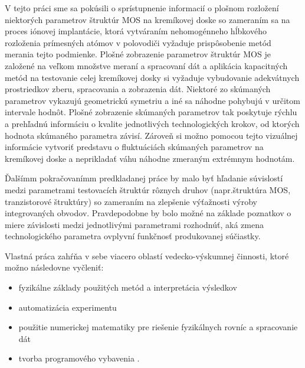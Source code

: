 
\par V tejto práci sme sa pokúsili o sprístupnenie informacií o
plošnom rozložení niektorých parametrov štruktúr MOS na kremíkovej
doske so zameraním sa na proces iónovej implantácie, ktorá vytváraním
nehomogénneho hĺbkového rozloženia prímesných atómov v polovodiči
vyžaduje prispôsobenie metód merania tejto podmienke. Plošné
zobrazenie parametrov štruktúr MOS je založené na veľkom množstve
meraní a spracovaní dát a aplikácia kapacitných metód na testovanie
celej kremíkovej dosky si vyžaduje vybudovanie adekvátnych
prostriedkov zberu, spracovania a zobrazenia dát. Niektoré zo
skúmaných parametrov vykazujú geometrickú symetriu a iné sa náhodne
pohybujú v určitom intervale hodnôt. Plošné zobrazenie skúmaných
parametrov tak poskytuje rýchlu a prehľadnú informáciu o kvalite
jednotlivých technologických krokov, od ktorých hodnota skúmaného
parametra závisí. Zároveň si možno pomocou tejto vizuálnej informácie
vytvoriť predstavu o fluktuáciách skúmaných parametrov na kremíkovej
doske a neprikladať váhu náhodne zmeraným extrémnym hodnotám.

\par Ďalšímm pokračovanímm predkladanej práce by malo byť hľadanie
súvislostí medzi parametrami testovacích štruktúr rôznych druhov
(napr.štruktúra MOS, tranzistorové štruktúry) so zameraním na
zlepšenie výťažnosti výroby integrovaných obvodov. Pravdepodobne by
bolo možné na základe poznatkov o miere závislosti medzi jednotlivými
parametrami rozhodnúť, aká zmena technologického parametra ovplyvní
funkčnosť produkovanej súčiastky.

\par
Vlastná práca zahŕňa v sebe viacero oblastí vedecko-výskumnej
činnosti, ktoré možno následovne vyčleniť:
\begin{itemize}
\item{fyzikálne základy použitých metód a interpretácia výsledkov}
\item{automatizácia experimentu}
\item{použitie numerickej  matematiky pre riešenie fyzikálnych rovníc a spracovanie dát}
\item{tvorba programového vybavenia} .
\end{itemize}

